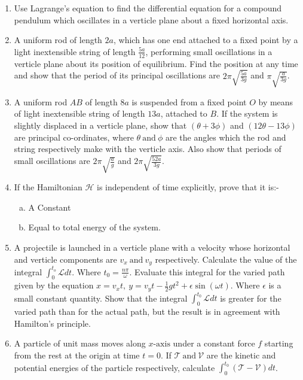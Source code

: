 \documentclass[12pt, a4paper]{article} %
\begin{document}
\begin{enumerate}
    \item Use Lagrange's equation to find the differential equation for a compound pendulum which oscillates in a verticle plane about a fixed horizontal axis.
    \item A uniform rod of length $\displaystyle 2a$, which has one end attached to a fixed point by a light inextensible string of length $\displaystyle \frac{5a}{12}$, performing small oscillations in a verticle plane about its position of equilibrium. Find the position at any time and show that the period of its principal oscillations are $\displaystyle 2 \pi \sqrt{\frac{5a}{3g}}$ and $\displaystyle \pi \sqrt{\frac{a}{3g}}$.
    \item A uniform rod $\displaystyle AB$ of length $\displaystyle 8a$ is suspended from a fixed point $\displaystyle O$ by means of light inextensible string of length $\displaystyle 13a$, attached to $\displaystyle B$. 
    If the system is slightly displaced in a verticle plane, show that $\displaystyle \left(\theta + 3 \phi \right)$ and $\displaystyle \left(12 \theta - 13 \phi \right)$ are principal co-ordinates, where $\displaystyle \theta\ \mbox{and}\ \phi$ are the angles which the rod and string respectively make with the verticle axis.
    Also show that periods of small oscillations are $\displaystyle 2 \pi \sqrt{\frac{a}{g}}$ and $\displaystyle 2 \pi \sqrt{\frac{52a}{3g}}$.
    \item If the Hamiltonian $\displaystyle \mathscr{H}$ is independent of time explicitly, prove that it is:-
    \begin{enumerate}[(a)]
        \item A Constant
        \item Equal to total energy of the system.
    \end{enumerate}
    \item A projectile is launched in a verticle plane with a velocity whose horizontal and verticle components are $\displaystyle v_x\ \mbox{and}\ v_y$ respectively. Calculate the value of the integral $\displaystyle \int_{0}^{t_o} \mathscr{L} dt$. Where $\displaystyle t_0 = \frac{n \pi}{\omega}$. Evaluate this integral for the varied path given by the equation $\displaystyle x = v_x t,\ y = v_y t - \frac{1}{2}gt^2 + \epsilon \sin(\omega t)$. Where $\displaystyle \epsilon$ is a small constant quantity. 
    Show that the integral $\displaystyle \int_{0}^{t_0} \mathscr{L} dt$ is greater for the varied path than for the actual path, but the result is in agreement with Hamilton's principle. 
    \item A particle of unit mass moves along $x\mbox{-axis}$ under a constant force $\displaystyle f$ starting from the rest at the origin at time $\displaystyle t = 0$. If $\mathcal{T}\ \mbox{and}\ \mathcal{V}$ are the kinetic and potential energies of the particle respectively, calculate $\displaystyle \int_{0}^{t_0} \left(\mathcal{T - V}\right)dt$.
    

\end{enumerate}
\end{document}
